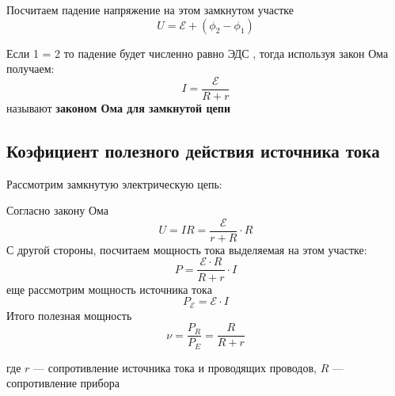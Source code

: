 \documentclass[../main.tex]{subfiles}
\begin{document}
Посчитаем падение напряжение на этом замкнутом участке
\[U = \mathscr{E} + (\phi_2 - \phi_1)\]

 Если 1 = 2 то падение будет численно равно ЭДС , тогда используя закон Ома получаем:
\[I = \frac{\mathscr{E}}{R + r}\]
называют \textbf{законом Ома для замкнутой цепи}

\subsection{Коэфициент полезного действия источника тока}
Рассмотрим замкнутую электрическую цепь:

\begin{center}


\end{center}

Согласно закону Ома 
\[ U = IR = \frac{\mathscr{E}}{r+R} \cdot R \]
С другой стороны, посчитаем мощность тока выделяемая на этом участке:
\[P = \frac{\mathscr{E} \cdot R}{R+r} \cdot I\]
еще рассмотрим мощность источника тока
\[P_{\mathscr{E}} = \mathscr{E} \cdot I\]
Итого полезная мощность
\[\nu = \frac{P_R}{P_E} = \frac{R}{R+r}\]
\begin{center}
    где $r$ --- сопротивление источника тока и проводящих проводов, $R$ --- сопротивление прибора 
\end{center}
\end{document}
